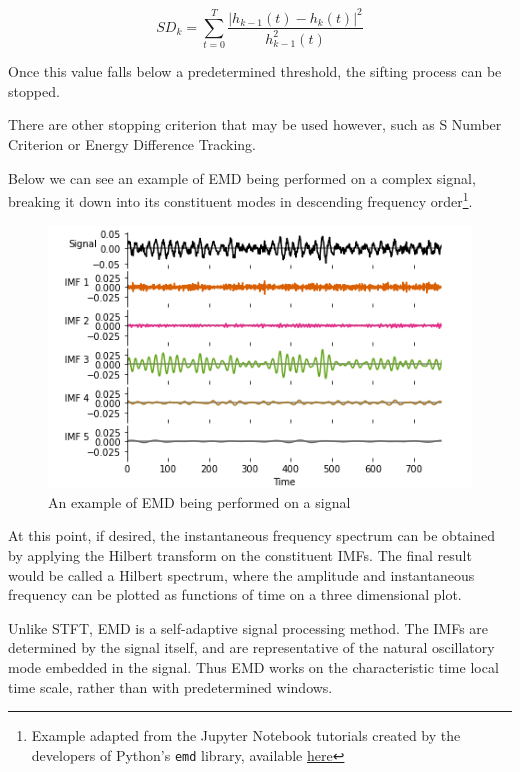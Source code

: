 \documentclass[
  paper=a4,
  ,captions=tableheading
]{scrartcl}
\newcommand{\passthrough}[1]{#1}
\begin{document}
\begin{equation}
SD_{k}=\sum _{{t=0}}^{{T}}{\frac  {|h_{{k-1}}(t)-h_{k}(t)|^{2}}{h_{{k-1}}^{2}(t)}}
\end{equation}

Once this value falls below a predetermined threshold, the sifting
process can be stopped.

There are other stopping criterion that may be used however, such as S
Number Criterion or Energy Difference Tracking.

Below we can see an example of EMD being performed on a complex signal,
breaking it down into its constituent modes in descending frequency
order\footnote{Example adapted from the Jupyter Notebook tutorials
  created by the developers of Python's \passthrough{\lstinline!emd!}
  library, available
  \href{https://emd.readthedocs.io/en/stable/_downloads/e47aacca40568b7bb056bd96535966c4/emd_tutorials_jupyter.zip}{here}}.

\begin{figure}
\centering
\includegraphics{img/emd_example.png}
\caption{An example of EMD being performed on a signal}
\end{figure}

At this point, if desired, the instantaneous frequency spectrum can be
obtained by applying the Hilbert transform on the constituent IMFs. The
final result would be called a Hilbert spectrum, where the amplitude and
instantaneous frequency can be plotted as functions of time on a three
dimensional plot.

Unlike STFT, EMD is a self-adaptive signal processing method. The IMFs
are determined by the signal itself, and are representative of the
natural oscillatory mode embedded in the signal. Thus EMD works on the
characteristic time local time scale, rather than with predetermined
windows.
\end{document}
